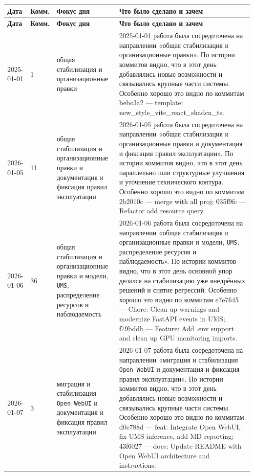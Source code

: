 \begingroup
\small
\setlength{\LTleft}{0pt}
\setlength{\LTright}{0pt}
\begin{longtable}{p{} p{} p{} p{}}
\textbf{Дата} & \textbf{Комм.} & \textbf{Фокус дня} & \textbf{Что было сделано и зачем} \\
\hline
\endfirsthead
\textbf{Дата} & \textbf{Комм.} & \textbf{Фокус дня} & \textbf{Что было сделано и зачем} \\
\hline
\endhead
2025-01-01 & 1 & общая стабилизация и организационные правки & 2025-01-01 работа была сосредоточена на направлении «общая стабилизация и организационные правки». По истории коммитов видно, что в этот день добавлялись новые возможности и связывались крупные части системы. Особенно хорошо это видно по коммитам bebc3a2 — template: new\_style\_vite\_react\_shadcn\_ts. \\
2026-01-05 & 11 & общая стабилизация и организационные правки и документация и фиксация правил эксплуатации & 2026-01-05 работа была сосредоточена на направлении «общая стабилизация и организационные правки и документация и фиксация правил эксплуатации». По истории коммитов видно, что в этот день параллельно шли структурные улучшения и уточнение технического контура. Особенно хорошо это видно по коммитам 2b2010c — merge with all proj; 035f9fc — Refactor add resource query. \\
2026-01-06 & 36 & общая стабилизация и организационные правки и модели, \texttt{UMS}, распределение ресурсов и наблюдаемость & 2026-01-06 работа была сосредоточена на направлении «общая стабилизация и организационные правки и модели, \texttt{UMS}, распределение ресурсов и наблюдаемость». По истории коммитов видно, что в этот день основной упор делался на стабилизацию уже внедрённых решений и снятие регрессий. Особенно хорошо это видно по коммитам e7e7645 — Chore: Clean up warnings and modernize FastAPI events in UMS; f79bddb — Feature: Add .env support and clean up GPU monitoring imports. \\
2026-01-07 & 3 & миграция и стабилизация \texttt{Open WebUI} и документация и фиксация правил эксплуатации & 2026-01-07 работа была сосредоточена на направлении «миграция и стабилизация \texttt{Open WebUI} и документация и фиксация правил эксплуатации». По истории коммитов видно, что в этот день добавлялись новые возможности и связывались крупные части системы. Особенно хорошо это видно по коммитам d0c788d — feat: Integrate Open WebUI, fix UMS inference, add MD reporting; 43f6027 — docs: Update README with Open WebUI architecture and instructions. \\

\end{longtable}
